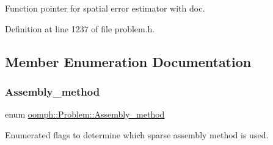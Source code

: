 Function pointer for spatial error estimator with doc. 



Definition at line 1237 of file problem.\+h.



\subsection{Member Enumeration Documentation}
\mbox{\label{classoomph_1_1Problem_ac793c004113930938730ec04dd2245b7}} 
\subsubsection{\texorpdfstring{Assembly\+\_\+method}{Assembly\_method}}
{\footnotesize\ttfamily enum \hyperlink{classoomph_1_1Problem_ac793c004113930938730ec04dd2245b7}{oomph\+::\+Problem\+::\+Assembly\+\_\+method}\hspace{0.3cm}{\ttfamily [protected]}}



Enumerated flags to determine which sparse assembly method is used. 

